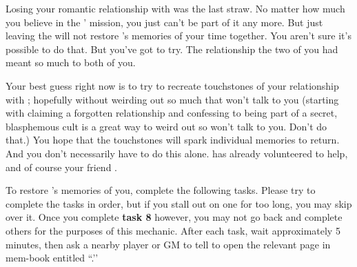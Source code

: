 \documentclass[green]{GL2020}
\begin{document}
\name{\gRestoringLove{}}

Losing your romantic relationship with \cHeadScientist{\full} was the last straw. No matter how much you believe in the \pGoaties{}’ mission, you just can’t be part of it any more. But just leaving the \pGoaties{} will not restore \cHeadScientist{}’s memories of your time together. You aren’t sure it’s possible to do that. But you’ve got to try. The relationship the two of you had meant so much to both of you.

Your best guess right now is to try to recreate touchstones of your relationship with \cHeadScientist{}; hopefully without weirding \cHeadScientist{\them} out so much that \cHeadScientist{\they} won’t talk to you (starting with claiming a forgotten relationship and confessing to being part of a secret, blasphemous cult is a great way to weird \cHeadScientist{\them}out so \cHeadScientist{\they}won’t talk to you. Don’t do that.) You hope that the touchstones will spark individual memories to return. And you don’t necessarily have to do this alone. \cInitiate{\full} has already volunteered \cInitiate{\themself} to help, and of course your friend \cLibrarian{}.

To restore \cHeadScientist{}’s memories of you, complete the following tasks. Please try to complete the tasks in order, but if you stall out on one for too long, you may skip over it. Once you complete \textbf{task 8} however, you may not go back and complete others for the purposes of this mechanic. After each task, wait approximately 5 minutes, then ask a nearby player or GM to tell \cHeadScientist{} to open the relevant page in \cHeadScientist{\their} mem-book entitled ``\mIdleThoughts{}.’’
\end{document}
